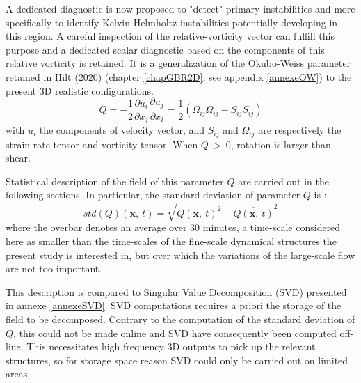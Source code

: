 A dedicated diagnostic is now proposed to "detect" primary instabilities and more specifically to identify Kelvin-Helmholtz instabilities potentially developing in this region. 
A careful inspection of the relative-vorticity vector can fulfill this purpose and a dedicated scalar diagnostic based on the components of this relative vorticity is retained. It is a generalization of the Okubo-Weiss parameter retained in Hilt (2020) (chapter \ref{chapGBR2D}, see appendix \ref{annexeOW}) to the present 3D realistic configurations. 
\begin{equation}
Q=-\frac{1}{2} \frac{\partial u_i}{\partial x_j} \frac{\partial u_j}{\partial x_i} = \frac{1}{2} (\Omega_{ij}\Omega_{ij} - S_{ij} S_{ij})
\end{equation}
with $u_i$ the components of velocity vector, and $S_{ij}$ and $\Omega_{ij}$ are respectively the strain-rate tensor and vorticity tensor. When $Q\ >\ 0$, rotation is larger than shear.

Statistical description of the field of this parameter $Q$ are carried out in the following sections. In particular, the standard deviation of parameter $Q$ is :
\begin{equation} 
\label{eqstdQ} 
    std ( Q ) (\mathbf{x},\ t)=  \sqrt{   \overline{Q (\mathbf{x},\ t)^{2}} -  \overline{Q(\mathbf{x},\ t)}^{2}  }
\end{equation}
where the overbar denotes an average over 30 minutes, a time-scale considered here as smaller than the time-scales of the fine-scale dynamical structures the present study is interested in, but over which the variations of the large-scale flow are not too important.

This description is compared to Singular Value Decomposition (SVD) presented in annexe \ref{annexeSVD}. SVD computations requires a priori the storage of the field to be decomposed. Contrary to the computation of the standard deviation of $Q$, this could not be made online and SVD have consequently been computed off-line. This necessitates high frequency 3D outputs to pick up the relevant structures, so for storage space reason SVD could only be carried out on limited areas.  


